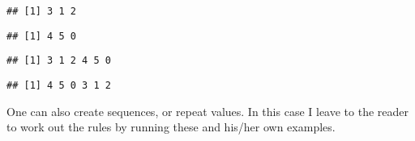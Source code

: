 \documentclass[paper=a4,headsepline,BCOR=12mm,twoside,open=right,%
titlepage,headings=small,fontsize=10pt,index=totoc,bibliography=totoc,%
captions=tableheading,captions=nooneline]{scrbook}\usepackage{knitr}
\begin{document}
\begin{knitrout}\footnotesize
{}\color{fgcolor}\begin{kframe}
\begin{alltt}
 \hlkwb{<-} \hlstd{(}\hlstd{,}\hlstd{,}\hlstd{)}
\end{alltt}
\begin{verbatim}
## [1] 3 1 2
\end{verbatim}
\begin{alltt}
 \hlkwb{<-} \hlstd{(}\hlstd{,}\hlstd{,}\hlstd{)}
\end{alltt}
\begin{verbatim}
## [1] 4 5 0
\end{verbatim}
\begin{alltt}
 \hlkwb{<-} 
\end{alltt}
\begin{verbatim}
## [1] 3 1 2 4 5 0
\end{verbatim}
\begin{alltt}
 \hlkwb{<-} 
\end{alltt}
\begin{verbatim}
## [1] 4 5 0 3 1 2
\end{verbatim}
\end{kframe}
\end{knitrout}

One can also create sequences, or repeat values. In this case I leave to the reader to work out the rules by running these and his/her own examples.
\end{document}
